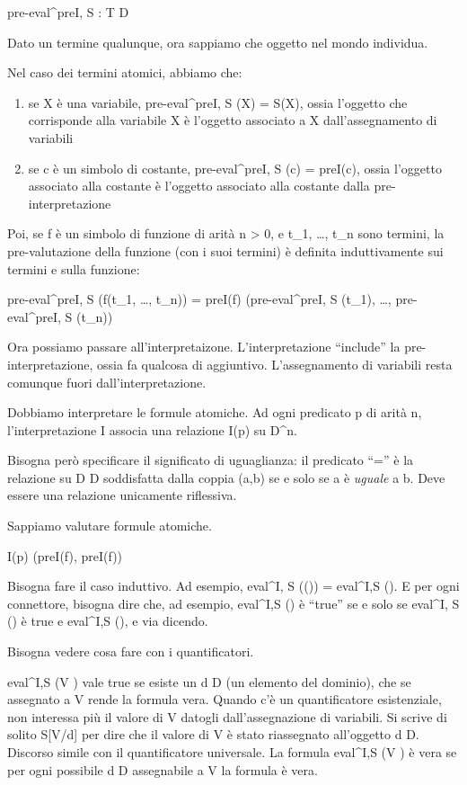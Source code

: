 pre-eval^{preI, S} : T \to D

Dato un termine qualunque, ora sappiamo che oggetto nel mondo individua.

Nel caso dei termini atomici, abbiamo che:
\begin{enumerate}
    \item se X \`e una variabile, pre-eval^{preI, S} (X) = S(X), ossia l'oggetto che corrisponde alla variabile X \`e l'oggetto associato a X dall'assegnamento di variabili
    \item se c \`e un simbolo di costante, pre-eval^{preI, S} (c) = preI(c), ossia l'oggetto associato alla costante \`e l'oggetto associato alla costante dalla pre-interpretazione
\end{enumerate}

Poi, se f \`e un simbolo di funzione di arit\`a n > 0, e t_1, \ldots, t_n sono termini, la pre-valutazione della funzione (con i suoi termini) \`e definita induttivamente sui termini e sulla funzione:

pre-eval^{preI, S} (f(t_1, \ldots, t_n)) = 
preI(f) (pre-eval^{preI, S} (t_1), \ldots, pre-eval^{preI, S} (t_n))

Ora possiamo passare all'interpretaizone. L'interpretazione ``include'' la pre-interpretazione, ossia fa qualcosa di aggiuntivo. L'assegnamento di variabili resta comunque fuori dall'interpretazione.

Dobbiamo interpretare le formule atomiche. Ad ogni predicato p di arit\`a n, l'interpretazione I associa una relazione I(p) su D^n.

Bisogna per\`o specificare il significato di uguaglianza: il predicato ``='' \`e la relazione su D \times D soddisfatta dalla coppia (a,b) se e solo se a \`e \emph{uguale} a b. Deve essere una relazione unicamente riflessiva.

Sappiamo valutare formule atomiche.

I(p) (preI(f), preI(f))

Bisogna fare il caso induttivo. Ad esempio, eval^{I, S} ((\phi)) = eval^{I,S} (\phi). E per ogni connettore, bisogna dire che, ad esempio, eval^{I,S} (\phi \land \psi) \`e ``true'' se e solo se eval^{I, S} (\phi) \`e true e eval^{I,S} (\psi), e via dicendo.

Bisogna vedere cosa fare con i quantificatori.

eval^{I,S} (\exists V \phi) vale true se esiste un d \in D (un elemento del dominio), che se assegnato a V rende la formula vera. Quando c'\`e un quantificatore esistenziale, non interessa pi\`u il valore di V datogli dall'assegnazione di variabili. Si scrive di solito S[V/d] per dire che il valore di V \`e stato riassegnato all'oggetto d \in D. Discorso simile con il quantificatore universale. La formula eval^{I,S} (\forall V \phi) \`e vera se per ogni possibile d \in D assegnabile a V la formula \`e vera.

